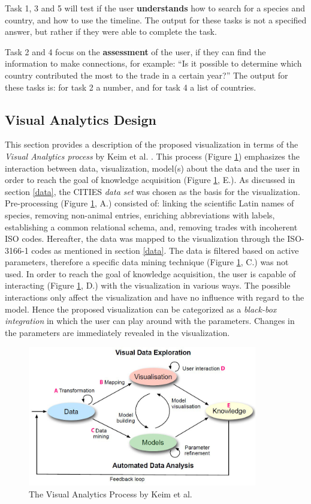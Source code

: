 Task 1, 3 and 5 will test if the user \textbf{understands} how to search for a species and country, and how to use the timeline. The output for these tasks is not a specified answer, but rather if they were able to complete the task.

Task 2 and 4 focus on the \textbf{assessment} of the user, if they can find the information to make connections, for example: ``Is it possible to determine which country contributed the most to the trade in a certain year?'' The output for these tasks is: for task 2 a number, and for task 4 a list of countries.

\subsection{Visual Analytics Design}
This section provides a description of the proposed visualization in terms of the \textit{Visual Analytics process} by Keim et al. \cite{Keim2008}. This process (Figure \ref{VAP_Keim}) emphasizes the interaction between data, visualization, model(s) about the data and the user in order to reach the goal of knowledge acquisition (Figure \ref{VAP_Keim}, E.). As discussed in section \ref{data}, the CITIES \textit{data set} was chosen as the basis for the visualization. Pre-processing (Figure \ref{VAP_Keim}, A.) consisted of: linking the scientific Latin names of species, removing non-animal entries, enriching abbreviations with labels, establishing a common relational schema, and, removing trades with incoherent ISO codes. Hereafter, the data was mapped to the visualization through the ISO-3166-1 codes as mentioned in section \ref{data}. The data is filtered based on active parameters, therefore a specific data mining technique (Figure \ref{VAP_Keim}, C.) was not used. In order to reach the goal of knowledge acquisition, the user is capable of interacting (Figure \ref{VAP_Keim}, D.) with the visualization in various ways. The possible interactions only affect the visualization and have no influence with regard to the model. Hence the proposed visualization can be categorized as a \textit{black-box integration} \cite{BertiniInvestigatingDiscovery} in which the user can play around with the parameters. Changes in the parameters are immediately revealed in the visualization. 

\begin{figure} [h]
\centering
\includegraphics[width=10cm]{images/keim.jpg}
\caption{The Visual Analytics Process by Keim et al. \cite{Keim2008}}
\label{VAP_Keim}
\end{figure}

